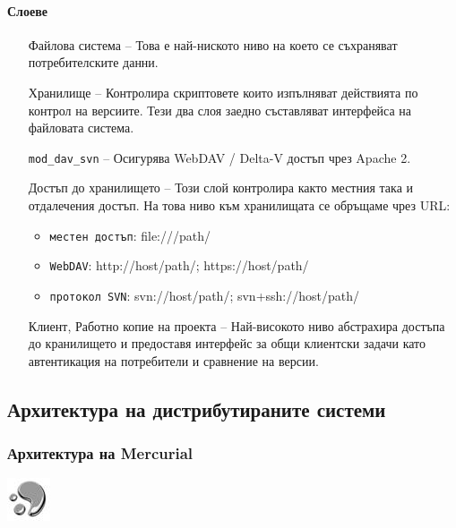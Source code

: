 \documentclass[a4paper]{article}
\def\Hg{Mercurial}
\begin{document}
    \paragraph{Слоеве}

    \begin{itemize}
      \item [Файлова система] -- Това е най-ниското ниво на което се
      съхраняват потребителските данни.
      \item [Хранилище] -- Контролира скриптовете които изпълняват действията по
      контрол на версиите. Тези два слоя заедно съставляват интерфейса на
      файловата система.
      \item [\texttt{mod\_dav\_svn}] -- Осигурява WebDAV / Delta-V достъп чрез Apache 2.
      \item [Достъп до хранилището] -- Този слой контролира както местния
      така и отдалечения достъп. На това ниво към хранилищата се обръщаме чрез
      URL:
        \begin{itemize}
          \item \texttt{местен достъп}: file:///path/
          \item \texttt{WebDAV}: http://host/path/; https://host/path/
          \item \texttt{протокол SVN}: svn://host/path/; svn+ssh://host/path/
        \end{itemize}
      \item [Клиент, Работно копие на проекта] -- Най-високото ниво абстрахира
      достъпа до кранилището и предоставя интерфейс за общи клиентски задачи
      като автентикация на потребители и сравнение на версии.
    \end{itemize}

  \subsection{Архитектура на дистрибутираните системи}

    \subsubsection{Архитектура на \Hg}
    \includegraphics[scale=1.0]{hg_icon}
\end{document}
